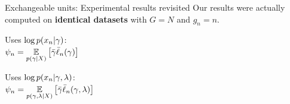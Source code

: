 \begin{frame}{Exchangeable units: Experimental results revisited}
    Our results were actually computed on \textbf{identical datasets}
    with $G = N$ and $g_n=n$.

    \begin{center}
    \begin{minipage}{0.34\textwidth}
        Uses $\log p(x_n \vert \gamma)$:\\
        $\psi_n = \underset{p(\gamma \vert X)}{\mathbb{E}}\left[\bar{\gamma} \bar{\ell}_n(\gamma)\right]$

    \end{minipage}
    \begin{minipage}{0.65\textwidth}
        \LowDimAccuracyGraph{}
    \end{minipage}

    \begin{minipage}{0.34\textwidth}
        Uses $\log p(x_n \vert \gamma, \lambda)$:\\
        $\psi_n = \underset{p(\gamma,\lambda \vert X)}{\mathbb{E}}\left[\bar{\gamma} \bar{\ell}_n(\gamma, \lambda)\right]$



    \end{minipage}
    \begin{minipage}{0.65\textwidth}
        \HighDimAccuracyGraph{}
    \end{minipage}
\end{center}
\end{frame}







